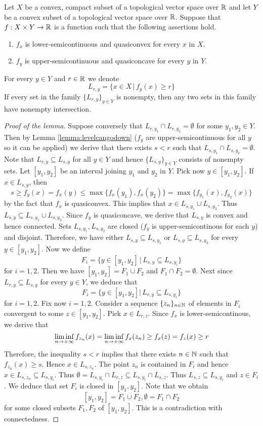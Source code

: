 \begin{lemma}\label{lemma:pairintersectionsionslemma}
Let $X$ be a convex, compact subset of a topological vector space over ${\mathbb R}$ and let $Y$ be a convex subset of a topological vector space over ${\mathbb R}$. Suppose that $f:X\times Y\rightarrow {\mathbb R}$ is a function such that the following assertions hold.
\begin{enumerate}[label=\emph{\textbf{(\arabic*)}}, leftmargin=3.0em]
\item $f_x$ is lower-semicontinuous and quasiconvex for every $x$ in $X$.
\item $f_y$ is upper-semicontinuous and quasiconcave for every $y$ in $Y$.
\end{enumerate}
For every $y\in Y$ and $r \in {\mathbb R}$ we denote
$$L_{r,y} = \big\{x\in X\,\big|\,f_y(x)\geq r \big\}$$
If every set in the family $\{L_{r,y}\}_{y\in Y}$ is nonempty, then any two sets in this family have nonempty intersection. 
\end{lemma}
\begin{proof}[Proof of the lemma]
Suppose conversely that $L_{r,y_1}\cap L_{r,y_2} = \emptyset$ for some $y_1,y_2\in Y$. Then by Lemma \ref{lemma:levelcangodown} ($f_y$ are upper-semicontinuous for all $y$ so it can be applied) we derive that there exists $s < r$ such that $L_{s,y_1}\cap L_{s,y_2}= \emptyset$. Note that $L_{r,y}\subseteq L_{s,y}$ for all $y\in Y$ and hence $\{L_{s,y}\}_{y\in Y}$ consists of nonempty sets. Let $[y_1,y_2]$ be an interval joining $y_1$ and $y_2$ in $Y$. Pick now $y\in [y_1,y_2]$. If $x\in L_{s,y}$, then
$$s\geq f_y(x) = f_x(y) \leq \max\{f_{x}(y_1),f_{x}(y_2)\} = \max\{f_{y_1}(x), f_{y_2}(x)\}$$
by the fact that $f_x$ is quasiconvex. This implies that $x\in L_{s,y_1}\cup L_{s,y_2}$. Thus $L_{s,y}\subseteq L_{s,y_1}\cup L_{s,y_2}$. Since $f_y$ is quasiconcave, we derive that $L_{s,y}$ is convex and hence connected. Sets $L_{s,y_1},L_{s,y_2}$ are closed ($f_y$ is upper-semicontinous for each $y$) and disjoint. Therefore, we have either $L_{s,y}\subseteq L_{s,y_1}$ or $L_{s,y}\subseteq L_{s,y_2}$ for every $y\in [y_1,y_2]$. Now we define
$$F_i = \big\{y\in [y_1,y_2]\,\big|\,L_{s,y}\subseteq L_{s,y_i}\big\}$$
for $i=1, 2$. Then we have $[y_1,y_2] = F_1\cup F_2$ and $F_1\cap F_2 = \emptyset$. Next since $L_{r,y}\subseteq L_{s,y}$ for every $y\in Y$, we deduce that
$$F_i = \big\{y\in [y_1,y_2]\big|\,L_{r,y}\subseteq L_{s,y_i}\big\}$$
for $i = 1, 2$. Fix now $i = 1, 2$. Consider a sequence $\{z_n\}_{n\in {\mathbb N}}$ of elements in $F_i$ convergent to some $z\in [y_1,y_2]$. Pick $x\in L_{r,z}$. Since $f_x$ is lower-semicontinous, we derive that
$$\liminf_{n\rightarrow +\infty}f_{z_n}(x)=\liminf_{n\rightarrow +\infty}f_x(z_n) \geq f_x(z) = f_z(x) \geq r$$
Therefore, the inequality $s< r$ implies that there exists $n\in {\mathbb N}$ such that $f_{z_n}(x)\geq s$. Hence $x\in L_{s,z_n}$. The point $z_n$ is contained in $F_i$ and hence $x\in L_{s,z_n}\subseteq L_{s,y_i}$. Thus $\emptyset = L_{s,y_i}\cap L_{r,z}\subseteq L_{s,y_i}\cap L_{s,z}$. Thus $L_{s,z}\subseteq L_{s,y_i}$ and $z\in F_i$. We deduce that set $F_i$ is closed in $[y_1,y_2]$. Note that we obtain
$$[y_1,y_2] = F_1\cup F_2,\emptyset = F_1\cap F_2$$
for some closed subsets $F_1,F_2$ of $[y_1,y_2]$. This is a contradiction with connectedness.
\end{proof}
